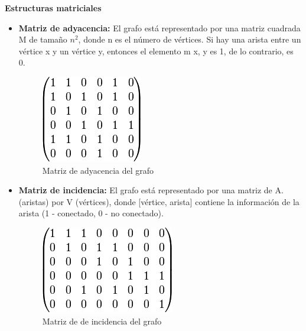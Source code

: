 {\bf Estructuras matriciales}
\begin{itemize}
	\item {\bf Matriz de adyacencia:} El grafo está representado por una matriz cuadrada M de tamaño $n^{2}$, donde n es el número de vértices. Si hay una arista entre un vértice x y un vértice y, entonces el elemento m {x, y} es 1, de lo contrario, es 0.
	\begin{figure}[h]
		\centering 
		\includegraphics[scale=0.6]{img/matrizadyacencia}
		\caption{Matriz de adyacencia del grafo}
		\label{contexto:figura5}
	\end{figure}
	\item {\bf Matriz de incidencia:} El grafo está representado por una matriz de A. (aristas) por V (vértices), donde [vértice, arista] contiene la información de la arista (1 - conectado, 0 - no conectado).
	\begin{figure}[h]
		\centering 
		\includegraphics[scale=0.6]{img/matrizincidencia}
		\caption{Matriz de de incidencia del grafo}
		\label{contexto:figura6}
	\end{figure}
\end{itemize}


